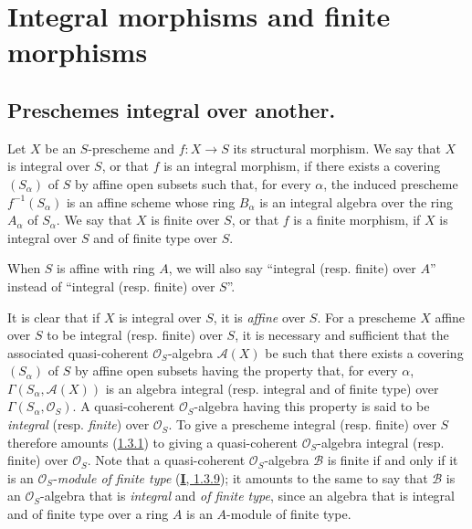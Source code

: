 \section{Integral morphisms and finite morphisms}
\label{section:II.6}

\subsection{Preschemes integral over another.}
\label{subsection:II.6.1}

\begin{definition}[6.1.1]
\label{II.6.1.1}
Let $X$ be an $S$-prescheme and $f:X\to S$ its structural morphism. We say
that $X$ is integral over $S$, or that $f$ is an integral
morphism, if there exists a covering $(S_\alpha)$ of $S$ by affine open
subsets such that, for every $\alpha$, the induced prescheme
$f^{-1}(S_\alpha)$ is an affine scheme whose ring $B_\alpha$ is an integral
algebra over the ring $A_\alpha$ of $S_\alpha$. We say that $X$ is
finite over $S$, or that $f$ is a finite morphism, if $X$ is
integral over $S$ and of finite type over $S$.
\end{definition}

When $S$ is affine with ring $A$, we will also say ``integral (resp. finite)
over $A$'' instead of ``integral (resp. finite) over $S$''.

\begin{env}[6.1.2]
\label{II.6.1.2}
It is clear that if $X$ is integral over $S$, it is \emph{affine} over $S$. For a
prescheme $X$ affine over $S$ to be integral (resp. finite) over $S$, it is
necessary and sufficient that the associated quasi-coherent
$\mathcal{O}_S$-algebra $\mathcal{A}(X)$ be such that there exists a
covering $(S_\alpha)$ of $S$ by affine open subsets having the property that,
for every $\alpha$, $\Gamma(S_\alpha,\mathcal{A}(X))$ is an algebra integral
(resp. integral and of finite type) over
$\Gamma(S_\alpha,\mathcal{O}_S)$. A quasi-coherent $\mathcal{O}_S$-algebra
having this property is said to be \emph{integral} (resp. \emph{finite}) over
$\mathcal{O}_S$. To give a prescheme integral (resp. finite) over $S$
therefore amounts (\hyperref[II.1.3.1]{1.3.1}) to giving a
quasi-coherent $\mathcal{O}_S$-algebra integral (resp. finite) over
$\mathcal{O}_S$. Note that a quasi-coherent $\mathcal{O}_S$-algebra
$\mathcal{B}$ is finite if and only if it is an $\mathcal{O}_S$-\emph{module of
finite type} (\hyperref[I.1.3.9]{\textbf{I}, 1.3.9}); it amounts to the same to say
that $\mathcal{B}$ is an $\mathcal{O}_S$-algebra that is \emph{integral} and \emph{of
finite type}, since an algebra that is integral and of finite type over a
ring $A$ is an $A$-module of finite type.
\end{env}

